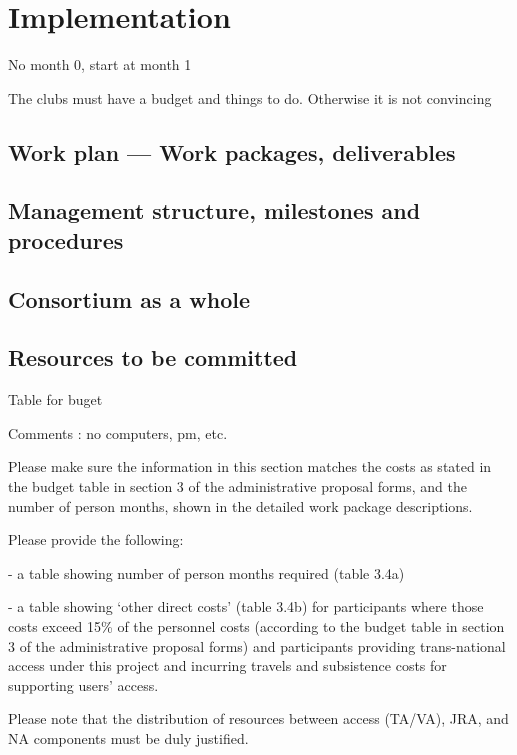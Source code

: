 \chapter{Implementation}\label{chap:implementation}

{\color{red} No month 0, start at month 1}

{\color{red} The clubs must have a budget and things to do. Otherwise
  it is not convincing}

\section{Work plan --- Work packages, deliverables}



\section{Management structure, milestones and procedures}



\section{Consortium as a whole}\label{sec:consortium}



\section{Resources to be committed}\label{sec:resources}


Table for buget

Comments : no computers, pm, etc.

\begin{todo}{}\color{red}
Please make sure the information in this section matches the costs as stated in the budget table in section 3 of the administrative proposal forms, and the number of person months, shown in the detailed work package descriptions.

Please provide the following:

- a table showing number of person months required (table 3.4a)

- a table showing ‘other direct costs’ (table 3.4b) for participants where those  costs exceed 15\% of the personnel costs (according to the budget  table in section 3 of the administrative proposal forms) and participants providing trans-national access under this project and incurring travels and subsistence costs for supporting users' access.

Please note that the distribution of resources between access (TA/VA), JRA, and NA components must be duly justified.
\end{todo}

